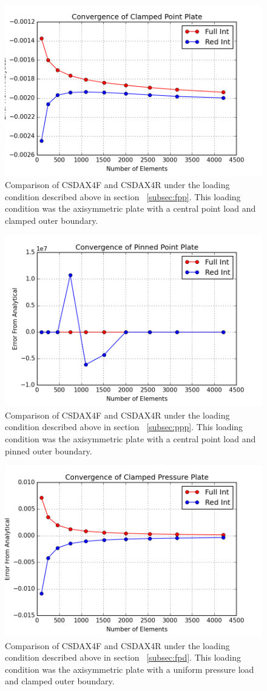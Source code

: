 \documentclass[10pt,letterpaper]{report}
\numberwithin{equation}{chapter}
\begin{document}
\begin{figure}[H]
\centering
\includegraphics[width=0.7\linewidth]{./GoodImages/Conv_PlPoCl_1}
\caption[H refinement of CSDAX4F]{Comparison of CSDAX4F and CSDAX4R under the loading condition described above in section ~\ref{subsec:fpp}. This loading condition was the axisymmetric plate with a central point load and clamped outer boundary.}
\label{fig:Conv_PlPoCl_1}
\end{figure}

\begin{figure}[H]
\centering
\includegraphics[width=0.7\linewidth]{./GoodImages/Conv_PlPoPi_1}
\caption[H refinement of CSDAX4F]{Comparison of CSDAX4F and CSDAX4R under the loading condition described above in section ~\ref{subsec:ppp}. This loading condition was the axisymmetric plate with a central point load and pinned outer boundary.}
\label{fig:Conv_PlPoCl_1}
\end{figure}

\begin{figure}[H]
\centering
\includegraphics[width=0.7\linewidth]{./GoodImages/Conv_PlPrCl_1}
\caption[H refinement of CSDAX4F]{Comparison of CSDAX4F and CSDAX4R under the loading condition described above in section ~\ref{subsec:fpd}. This loading condition was the axisymmetric plate with a uniform pressure load and clamped outer boundary.}
\label{fig:Conv_PlPoCl_1}
\end{figure}
\end{document}
